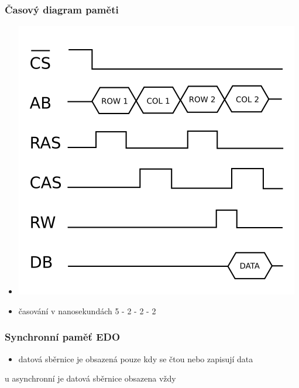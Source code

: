 \documentclass[a4paper,12pt]{article}
\providecommand{\tightlist}{%
\setlength{\itemsep}{0pt}\setlength{\parskip}{0pt}}
\begin{document}
\subsubsection{Časový diagram paměti}

\begin{itemize}
\tightlist
\item[] \includegraphics[width=12.46cm]{ref/casovy-diagram-dynamicke-pameti.png}
\item časování v nanosekundách 5 - 2 - 2 - 2
\end{itemize}

\subsubsection{Synchronní paměť EDO}

\begin{itemize}
\tightlist
\item datová sběrnice je obsazená pouze kdy se čtou nebo zapisují data
\end{itemize}

u asynchronní je datová sběrnice obsazena vždy
\end{document}
